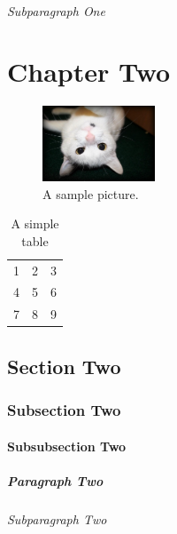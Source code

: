 \documentclass{doc}
\begin{document}
\subparagraph{Subparagraph One}
\blindtext


\chapter{Chapter Two}
\blindtext

\begin{figure}[ht]
	\includegraphics[width=0.3\textwidth]{myfigure}
	\caption{A sample picture.}
\end{figure}

\begin{table}[ht]
	\begin{tabular}{| l c r |}
		\hline
		1 & 2 & 3 \\
		4 & 5 & 6 \\
		7 & 8 & 9 \\
		\hline
	\end{tabular}
	\caption{A simple table}
\end{table}

\section{Section Two}
\blindtext

\subsection{Subsection Two}
\blindtext

\subsubsection{Subsubsection Two}
\blindtext

\paragraph{Paragraph Two}
\blindtext

\subparagraph{Subparagraph Two}
\blindtext
\end{document}
